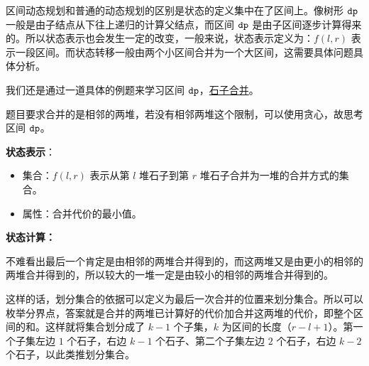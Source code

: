 
区间动态规划和普通的动态规划的区别是状态的定义集中在了区间上。像树形 $\tt dp$ 一般是由子结点从下往上递归的计算父结点，而区间 $\tt dp$ 是由子区间逐步计算得来的。所以状态表示也会发生一定的改变，一般来说，状态表示定义为：$f(l, r)$ 表示一段区间。而状态转移一般由两个小区间合并为一个大区间，这需要具体问题具体分析。

我们还是通过一道具体的例题来学习区间 $\tt dp$，\href{https://www.luogu.com.cn/problem/P1775}{石子合并}。

题目要求合并的是相邻的两堆，若没有相邻两堆这个限制，可以使用贪心，故思考区间 $\tt dp$。

\textbf{状态表示}：
\begin{itemize}
\item 集合：$f(l, r)$ 表示从第 $l$ 堆石子到第 $r$ 堆石子合并为一堆的合并方式的集合。
\item 属性：合并代价的最小值。
\end{itemize}

\textbf{状态计算：}

不难看出最后一个肯定是由相邻的两堆合并得到的，而这两堆又是由更小的相邻的两堆合并得到的，所以较大的一堆一定是由较小的相邻的两堆合并得到的。

这样的话，划分集合的依据可以定义为最后一次合并的位置来划分集合。所以可以枚举分界点，答案就是合并的两堆已计算好的代价加合并这两堆的代价，即整个区间的和。这样就将集合划分成了 $k - 1$ 个子集，$k$ 为区间的长度（$r - l + 1$）。第一个子集左边 $1$ 个石子，右边 $k - 1$ 个石子、第二个子集左边 $2$ 个石子，右边 $k - 2$ 个石子，以此类推划分集合。
